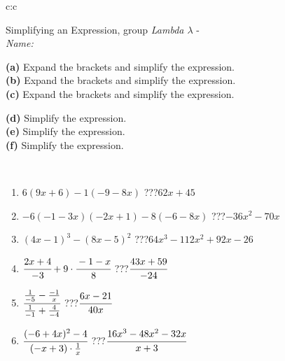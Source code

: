 \documentclass[10pt]{report}
\begin{document}
\newpage
\thispagestyle{empty}
\begin{tabular}{c:c}
\begin{minipage}[c][104.5mm][t]{0.5\linewidth}
\begin{center}
\vspace{7mm}
{\huge Simplifying an Expression, group \textit{Lambda $\lambda$} -}\\[5mm]
\textit{Name:}\phantom{xxxxxxxxxxxxxxxxxxxxxxxxxxxxxxxxxxxxxxxxxxxxxxxxxxxxxxxxxxxxxxxxx}\\[5mm]
\begin{minipage}{0.95\linewidth}
\begin{center}
{\small \begin{minipage}{0.6\textwidth}
\textbf{(a)} Expand the brackets and simplify the expression. \\[1mm]
\textbf{(b)} Expand the brackets and simplify the expression. \\[1mm]
\textbf{(c)} Expand the brackets and simplify the expression.
\end{minipage} \begin{minipage}{0.39\textwidth}
\textbf{(d)} Simplify the expression. \\[1mm]
\textbf{(e)} Simplify the expression. \\[1mm]
\textbf{(f)} Simplify the expression.
\end{minipage}
}
\end{center}
\end{minipage}
\\[4mm]
\begin{minipage}{0.79\linewidth}
\begin{center}
\begin{varwidth}{\linewidth}
\begin{enumerate}
\normalsize
\item $6(9x+6)-1(-9-8x)$\quad \dotfill\; ???\;\dotfill \quad $62x+45$
\item $-6(-1-3x)(-2x+1)-8(-6-8x)$\quad \dotfill\; ???\;\dotfill \quad $-36x^2-70x$
\item $(4x-1)^3-(8x-5)^2$\quad \dotfill\; ???\;\dotfill \quad $64x^3-112x^2+92x-26$
\item $\cfrac{2x+4}{-3}+9\cdot\cfrac{-1-x}{8}$\quad \dotfill\; ???\;\dotfill \quad $\cfrac{43x+59}{-24}$
\item $\cfrac{\frac{1}{-5}-\frac{-1}{x}}{\frac{1}{-1}+\frac{4}{-4}}$\quad \dotfill\; ???\;\dotfill \quad $\cfrac{6x-21}{40x}$
\item $\cfrac{(-6+4x)^2-4}{(-x+3)\cdot\frac{1}{x}}$\quad \dotfill\; ???\;\dotfill \quad $\cfrac{16x^3-48x^2-32x}{x+3}$

\end{enumerate}
\end{varwidth}
\end{center}
\end{minipage}
\end{center}
\end{minipage}
\end{tabular}
\end{document}

